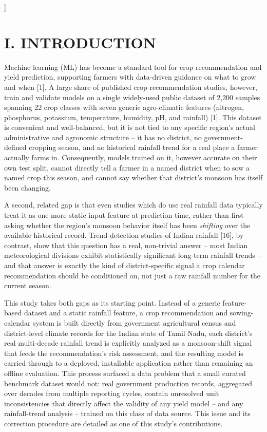 \documentclass[12pt,a4paper,twocolumn]{article}
\begin{document}
\vspace{10pt}
]

\section*{I. INTRODUCTION}

Machine learning (ML) has become a standard tool for crop recommendation and yield
prediction, supporting farmers with data-driven guidance on what to grow and when
[1]. A large share of published crop recommendation studies, however, train and
validate models on a single widely-used public dataset of 2,200 samples spanning 22
crop classes with seven generic agro-climatic features (nitrogen, phosphorus,
potassium, temperature, humidity, pH, and rainfall) [1]. This dataset is convenient
and well-balanced, but it is not tied to any specific region's actual administrative
and agronomic structure -- it has no district, no government-defined cropping season,
and no historical rainfall trend for a real place a farmer actually farms in.
Consequently, models trained on it, however accurate on their own test split, cannot
directly tell a farmer in a named district when to sow a named crop this season, and
cannot say whether that district's monsoon has itself been changing.

A second, related gap is that even studies which do use real rainfall data typically
treat it as one more static input feature at prediction time, rather than first
asking whether the region's monsoon behavior itself has been \emph{shifting} over the
available historical record. Trend-detection studies of Indian rainfall [16], by
contrast, show that this question has a real, non-trivial answer -- most Indian
meteorological divisions exhibit statistically significant long-term rainfall trends
-- and that answer is exactly the kind of district-specific signal a crop calendar
recommendation should be conditioned on, not just a raw rainfall number for the
current season.

This study takes both gaps as its starting point. Instead of a generic feature-based
dataset and a static rainfall feature, a crop recommendation and sowing-calendar
system is built directly from government agricultural census and district-level
climate records for the Indian state of Tamil Nadu, each district's real multi-decade
rainfall trend is explicitly analyzed as a monsoon-shift signal that feeds the
recommendation's risk assessment, and the resulting model is carried through to a
deployed, installable application rather than remaining an offline evaluation. This
process surfaced a data problem that a small curated benchmark dataset would not:
real government production records, aggregated over decades from multiple reporting
cycles, contain unresolved unit inconsistencies that directly affect the validity of
any yield model -- and any rainfall-trend analysis -- trained on this class of data
source. This issue and its correction procedure are detailed as one of this study's
contributions.
\end{document}
